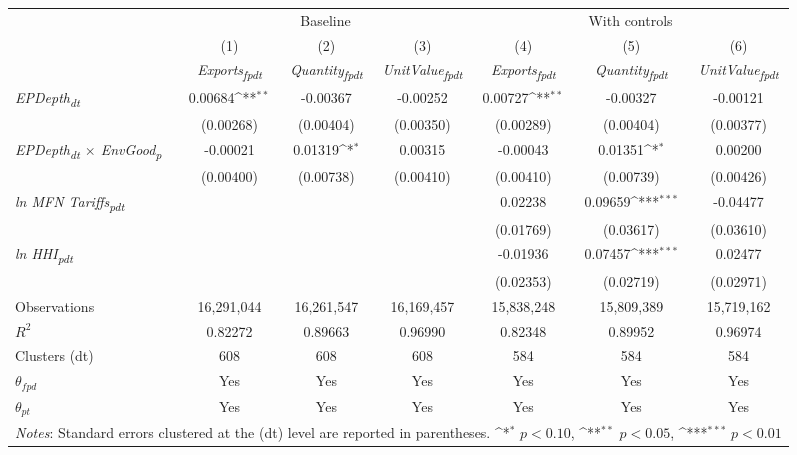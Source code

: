 {
\def\sym#1{\ifmmode^{#1}\else\(^{#1}\)\fi}
\begin{tabular}{l*{6}{c}}
\toprule
&\multicolumn{3}{c}{Baseline}&\multicolumn{3}{c}{With controls}\\\cmidrule(lr){2-4}\cmidrule(lr){5-7}
&(1)&(2)&(3)&(4)&(5)&(6)\\
&\textit{Exports\textsubscript{fpdt}}&\textit{Quantity\textsubscript{fpdt}}&\textit{UnitValue\textsubscript{fpdt}}&\textit{Exports\textsubscript{fpdt}}&\textit{Quantity\textsubscript{fpdt}}&\textit{UnitValue\textsubscript{fpdt}}\\
\midrule
\textit{EPDepth\textsubscript{dt}} & 0.00684\sym{**} & -0.00367 & -0.00252 & 0.00727\sym{**} & -0.00327 & -0.00121\\
 & (0.00268) & (0.00404) & (0.00350) & (0.00289) & (0.00404) & (0.00377)\\
\addlinespace
\textit{EPDepth\textsubscript{dt} $\times$ EnvGood\textsubscript{p}} & -0.00021 & 0.01319\sym{*} & 0.00315 & -0.00043 & 0.01351\sym{*} & 0.00200\\
 & (0.00400) & (0.00738) & (0.00410) & (0.00410) & (0.00739) & (0.00426)\\
\addlinespace
\textit{ln MFN Tariffs\textsubscript{pdt}} &  &  &  & 0.02238 & 0.09659\sym{***} & -0.04477\\
 &  &  &  & (0.01769) & (0.03617) & (0.03610)\\
\addlinespace
\textit{ln HHI\textsubscript{pdt}} &  &  &  & -0.01936 & 0.07457\sym{***} & 0.02477\\
 &  &  &  & (0.02353) & (0.02719) & (0.02971)\\
\midrule
Observations & 16,291,044 & 16,261,547 & 16,169,457 & 15,838,248 & 15,809,389 & 15,719,162\\
$R^{2}$ & 0.82272 & 0.89663 & 0.96990 & 0.82348 & 0.89952 & 0.96974\\
Clusters (dt) & 608 & 608 & 608 & 584 & 584 & 584\\
$\theta_{fpd}$ & Yes & Yes & Yes & Yes & Yes & Yes\\
$\theta_{pt}$ & Yes & Yes & Yes & Yes & Yes & Yes\\
\bottomrule
\multicolumn{7}{l}{\footnotesize \textit{Notes}: Standard errors clustered at the (dt) level are reported in parentheses. \sym{*} \(p<0.10\), \sym{**} \(p<0.05\), \sym{***} \(p<0.01\)}\\
\end{tabular}
}
